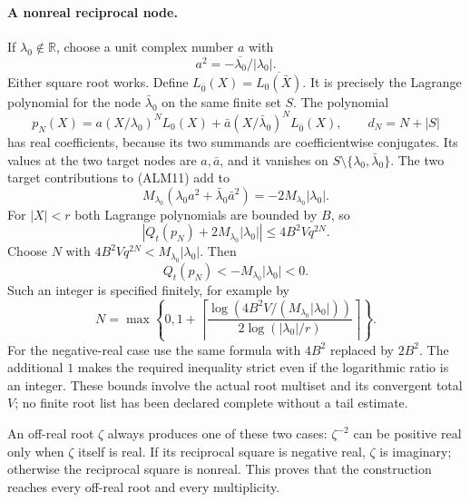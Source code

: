 \paragraph{A nonreal reciprocal node.}
If $\lambda_0\notin\mathbb R$, choose a unit complex number $a$ with
\begin{equation}\tag{ALM16}
 a^2=-\overline{\lambda_0}/|\lambda_0|.
\end{equation}
Either square root works. Define
$L_{\bar0}(X)=\overline{L_0(\bar X)}$. It is precisely the Lagrange
polynomial for the node $\bar\lambda_0$ on the same finite set $S$.
The polynomial
\begin{equation}\tag{ALM17}
 p_N(X)=a(X/\lambda_0)^NL_0(X)
       +\bar a(X/\bar\lambda_0)^NL_{\bar0}(X),\qquad
 d_N=N+|S|
\end{equation}
has real coefficients, because its two summands are coefficientwise
conjugates. Its values at the two target nodes are $a,\bar a$, and
it vanishes on $S\setminus\{\lambda_0,\bar\lambda_0\}$.
The two target contributions to (ALM11) add to
\[
 M_{\lambda_0}(\lambda_0a^2+
                       \bar\lambda_0\bar a^2)
                   =-2M_{\lambda_0}|\lambda_0|.
\]
For $|X|<r$ both Lagrange polynomials are bounded by $B$, so
\begin{equation}\tag{ALM18}
 \left|Q_t(p_N)+2M_{\lambda_0}|\lambda_0|\right|
 \le 4B^2Vq^{2N}.
\end{equation}
Choose $N$ with $4B^2Vq^{2N}<M_{\lambda_0}|\lambda_0|$. Then
\begin{equation}\tag{ALM19}
 Q_t(p_N)<-M_{\lambda_0}|\lambda_0|<0.
\end{equation}
Such an integer is specified finitely, for example by
\[
 N=\max\left\{0,
 1+\left\lceil
 \frac{\log(4B^2V/(M_{\lambda_0}|\lambda_0|))}
      {2\log(|\lambda_0|/r)}\right\rceil\right\}.
\]
For the negative-real case use the same formula with $4B^2$ replaced
by $2B^2$. The additional $1$ makes the required inequality strict
even if the logarithmic ratio is an integer. These bounds involve
the actual root multiset and its convergent total $V$; no finite
root list has been declared complete without a tail estimate.

An off-real root $\zeta$ always produces one of these two cases:
$\zeta^{-2}$ can be positive real only when $\zeta$ itself is real.
If its reciprocal square is negative real, $\zeta$ is imaginary;
otherwise the reciprocal square is nonreal. This proves that the
construction reaches every off-real root and every multiplicity.

